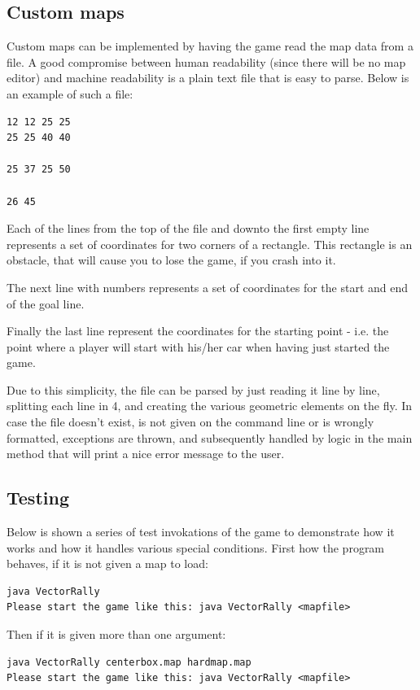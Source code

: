 \subsection*{Custom maps}
Custom maps can be implemented by having the game read the map data from a file.
A good compromise between human readability (since there will be no map editor)
and machine readability is a plain text file that is easy to parse.
Below is an example of such a file:
\begin{Verbatim}
12 12 25 25
25 25 40 40

25 37 25 50

26 45
\end{Verbatim}
Each of the lines from the top of the file and downto the first empty line
represents a set of coordinates for two corners of a rectangle. This
rectangle is an obstacle, that will cause you to lose the game, if you
crash into it.

The next line with numbers represents a set of coordinates for the start
and end of the goal line.

Finally the last line represent the coordinates for the starting point - i.e.
the point where a player will start with his/her car when having just started
the game.

Due to this simplicity, the file can be parsed by just reading it line by line,
splitting each line in 4, and creating the various geometric elements on the fly.
In case the file doesn't exist, is not given on the command line or is wrongly formatted,
exceptions are thrown, and subsequently handled by logic in the main method
that will print a nice error message to the user.

\subsection*{Testing}
Below is shown a series of test invokations of the game to demonstrate how
it works and how it handles various special conditions.
First how the program behaves, if it is not given a map to load:
\begin{Verbatim}
java VectorRally              
Please start the game like this: java VectorRally <mapfile>
\end{Verbatim}

Then if it is given more than one argument:
\begin{Verbatim}
java VectorRally centerbox.map hardmap.map 
Please start the game like this: java VectorRally <mapfile>
\end{Verbatim}

